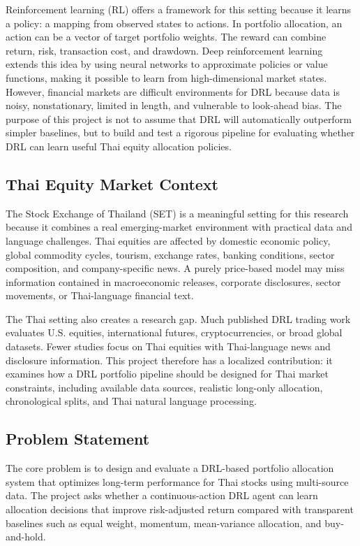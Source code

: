 \documentclass[11pt]{article}
\begin{document}
Reinforcement learning (RL) offers a framework for this setting because it learns a policy: a mapping from observed states to actions. In portfolio allocation, an action can be a vector of target portfolio weights. The reward can combine return, risk, transaction cost, and drawdown. Deep reinforcement learning extends this idea by using neural networks to approximate policies or value functions, making it possible to learn from high-dimensional market states. However, financial markets are difficult environments for DRL because data is noisy, nonstationary, limited in length, and vulnerable to look-ahead bias. The purpose of this project is not to assume that DRL will automatically outperform simpler baselines, but to build and test a rigorous pipeline for evaluating whether DRL can learn useful Thai equity allocation policies.

\subsection{Thai Equity Market Context}
The Stock Exchange of Thailand (SET) is a meaningful setting for this research because it combines a real emerging-market environment with practical data and language challenges. Thai equities are affected by domestic economic policy, global commodity cycles, tourism, exchange rates, banking conditions, sector composition, and company-specific news. A purely price-based model may miss information contained in macroeconomic releases, corporate disclosures, sector movements, or Thai-language financial text.

The Thai setting also creates a research gap. Much published DRL trading work evaluates U.S. equities, international futures, cryptocurrencies, or broad global datasets. Fewer studies focus on Thai equities with Thai-language news and disclosure information. This project therefore has a localized contribution: it examines how a DRL portfolio pipeline should be designed for Thai market constraints, including available data sources, realistic long-only allocation, chronological splits, and Thai natural language processing.

\subsection{Problem Statement}
The core problem is to design and evaluate a DRL-based portfolio allocation system that optimizes long-term performance for Thai stocks using multi-source data. The project asks whether a continuous-action DRL agent can learn allocation decisions that improve risk-adjusted return compared with transparent baselines such as equal weight, momentum, mean-variance allocation, and buy-and-hold.
\end{document}
